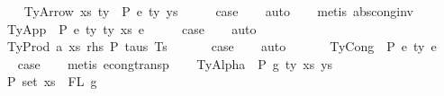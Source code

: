 \begin{isabellebody}
\isamarkupfalse%
\isanewline
\ \ \isamarkupfalse%
\ {\isacharparenleft}{\kern0pt}TyArrow\ xs\ ty{}\ {\isasymGamma}\ P\ e\ ty{}\ ys{\isacharparenright}{\kern0pt}\isanewline
\ \ \isamarkupfalse%
\ \isamarkupfalse%
\ {\isacharquery}{\kern0pt}case\isanewline
\ \ \isamarkupfalse%
\ auto\isanewline
\ \ \isamarkupfalse%
\ {\isacharparenleft}{\kern0pt}metis\ abs{\isacharunderscore}{\kern0pt}cong{\isacharunderscore}{\kern0pt}inv{\isacharparenright}{\kern0pt}\isanewline
{}\isamarkupfalse%
\isanewline
\ \ \isamarkupfalse%
\ {\isacharparenleft}{\kern0pt}TyApp\ {\isasymGamma}\ P\ e{}\ ty{}\ ty{}\ xs\ e{}{\isacharparenright}{\kern0pt}\isanewline
\ \ \isamarkupfalse%
\ \isamarkupfalse%
\ {\isacharquery}{\kern0pt}case\isanewline
\ \ \isamarkupfalse%
\ auto\isanewline
\ \ \isamarkupfalse%
\isanewline
{}\isamarkupfalse%
\isanewline
\ \ \isamarkupfalse%
\ {\isacharparenleft}{\kern0pt}TyProd\ a\ xs\ rhs\ P\ taus\ Ts\ {\isasymGamma}{\isacharparenright}{\kern0pt}\isanewline
\ \ \isamarkupfalse%
\ \isamarkupfalse%
\ {\isacharquery}{\kern0pt}case\isanewline
\ \ \isamarkupfalse%
\ auto\isanewline
\ \ \isamarkupfalse%
\isanewline
{}\isamarkupfalse%
\isanewline
\ \ \isamarkupfalse%
\ {\isacharparenleft}{\kern0pt}TyCong\ {\isasymGamma}\ P\ e{}\ ty\ e{}{\isacharparenright}{\kern0pt}\isanewline
\ \ \isamarkupfalse%
\ \isamarkupfalse%
\ {\isacharquery}{\kern0pt}case\isanewline
\ \ \isamarkupfalse%
\ {\isacharparenleft}{\kern0pt}metis\ econg{\isacharunderscore}{\kern0pt}transp{\isacharparenright}{\kern0pt}\isanewline
{}\isamarkupfalse%
\isanewline
\ \ \isamarkupfalse%
\ {\isacharparenleft}{\kern0pt}TyAlpha\ {\isasymGamma}{}{\isacharprime}{\kern0pt}\ P\ g\ ty{\isacharprime}{\kern0pt}\ xs{\isacharprime}{\kern0pt}\ ys{\isacharprime}{\kern0pt}{\isacharparenright}{\kern0pt}\isanewline
\ \ \isanewline
\ \ \isamarkupfalse%
\ P{}{\isacharcolon}{\kern0pt}\ {\isachardoublequoteopen}set\ xs{\isacharprime}{\kern0pt}\ {\isacharequal}{\kern0pt}\ FL\ g{\isachardoublequoteclose}\isanewline

\end{isabellebody}
